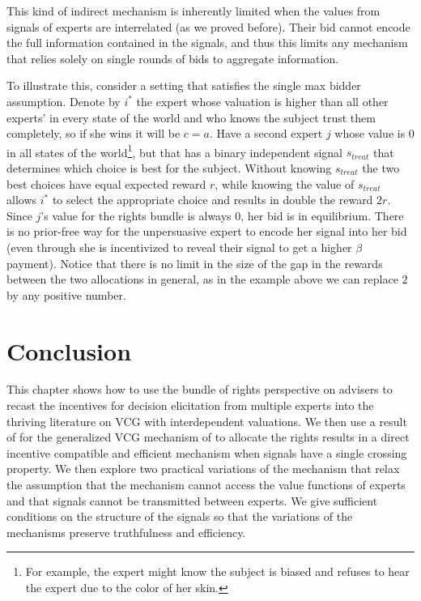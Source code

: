  
 This kind of indirect mechanism is inherently limited when the values from signals of experts are interrelated (as we proved before). Their bid cannot encode the full information contained in the signals, and thus this limits any mechanism that relies solely on single rounds of bids to aggregate information.
 
 To illustrate this, consider a setting that satisfies the single max bidder assumption. %
 Denote by $i^*$ the expert whose valuation is higher than all other experts' in every state of the world and who knows the subject trust them completely, so if she wins it will be $c=a$. Have a second expert $j$ whose value is $0$ in all states of the world\footnote{For example, the expert might know the subject is biased and refuses to hear the expert due to the color of her skin.}, but that has a binary independent signal $s_{treat}$ that determines which choice is best for the subject. Without knowing $s_{treat}$ the two best choices have equal expected reward $r$, while knowing the value of $s_{treat}$ allows $i^*$ to select the appropriate choice and results in double the reward $2r$.
 Since $j$'s value for the rights bundle is always 0, her bid is in equilibrium. 
 There is no prior-free way for the unpersuasive expert to encode her signal into her bid (even through she is incentivized to reveal their signal to get a higher $\beta$ payment). 
 Notice that there is no limit in the size of the gap in the rewards between the two allocations in general, as in the example above we can replace $2$ by any positive number.
 
 

\section{Conclusion}

This chapter shows how to use the bundle of rights perspective on advisers to recast the incentives for decision elicitation from multiple experts into the thriving literature on VCG with interdependent valuations.
We then use a result of \citep{roughgarden2016optimal} for the generalized VCG mechanism of \citep{maskin1992auctions} to allocate the rights results in a direct incentive compatible and efficient mechanism when signals have a single crossing property.
We then explore two practical variations of the mechanism that relax the assumption that the mechanism cannot access the value functions of experts and that signals cannot be transmitted between experts. We give sufficient conditions on the structure of the signals so that the variations of the mechanisms preserve truthfulness and efficiency.
